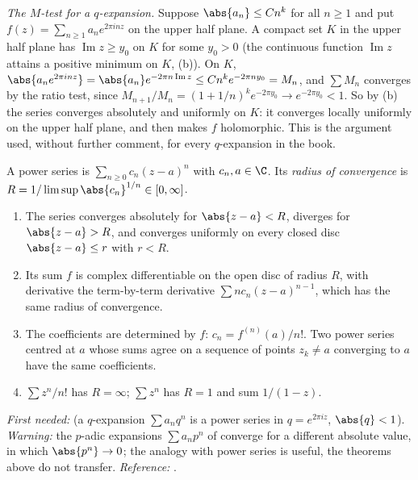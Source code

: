 \emph{The $M$-test for a $q$-expansion.} Suppose $\abs{a_n}\le Cn^k$ for all $n\ge1$ and put
$f(z)=\sum_{n\ge1}a_ne^{2\pi inz}$ on the upper half plane. A compact set $K$ in the upper half plane
has $\operatorname{Im}z\ge y_0$ on $K$ for some $y_0>0$ (the continuous function $\operatorname{Im}z$
attains a positive minimum on $K$, (b)). On $K$,
$\abs{a_ne^{2\pi inz}}=\abs{a_n}e^{-2\pi n\operatorname{Im}z}\le Cn^ke^{-2\pi ny_0}=M_n$, and
$\sum M_n$ converges by the ratio test, since $M_{n+1}/M_n=(1+1/n)^ke^{-2\pi y_0}\to e^{-2\pi y_0}<1$.
So by (b) the series converges absolutely and uniformly on $K$: it converges locally uniformly on the
upper half plane, and  then makes $f$ holomorphic. This is the argument
used, without further comment, for every $q$-expansion in the book.

\begin{definition}\label{def:prereq:power}
A power series is $\sum_{n\ge0}c_n(z-a)^n$ with $c_n,a\in\C$. Its \emph{radius of convergence} is
$R=1/\limsup\abs{c_n}^{1/n}\in[0,\infty]$.
\end{definition}

\begin{theorem}\label{thm:prereq:power}
\begin{enumerate}[label=(\alph*)]
\item The series converges absolutely for $\abs{z-a}<R$, diverges for $\abs{z-a}>R$, and converges
uniformly on every closed disc $\abs{z-a}\le r$ with $r<R$.
\item Its sum $f$ is complex differentiable on the open disc of radius $R$, with derivative the
term-by-term derivative $\sum nc_n(z-a)^{n-1}$, which has the same radius of convergence.
\item The coefficients are determined by $f$: $c_n=f^{(n)}(a)/n!$. Two power series centred at
$a$ whose sums agree on a sequence of points $z_k\ne a$ converging to $a$ have the same
coefficients.
\item $\sum z^n/n!$ has $R=\infty$; $\sum z^n$ has $R=1$ and sum $1/(1-z)$.
\end{enumerate}
\end{theorem}
\noindent\emph{First needed:}  (a $q$-expansion $\sum a_nq^n$ is a power series
in $q=e^{2\pi iz}$, $\abs{q}<1$). \emph{Warning:} the $p$-adic expansions $\sum a_np^n$ of
 converge for a different absolute value, in which $\abs{p^n}\to0$; the analogy with
power series is useful, the theorems above do not transfer. \emph{Reference:} \cite[Chapter 3,
Theorem 3.39, and Chapter 8]{Rudin76}.

